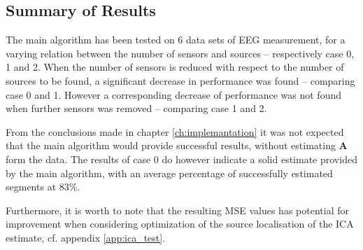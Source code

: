 \subsection{Summary of Results}
The main algorithm has been tested on 6 data sets of EEG measurement, for a varying relation between the number of sensors and sources -- respectively case 0, 1 and 2.
When the number of sensors is reduced with respect to the number of sources to be found, a significant decrease in performance was found -- comparing case 0 and 1. 
However a corresponding decrease of performance was not found when further sensors was removed -- comparing case 1 and 2. 

From the conclusions made in chapter \ref{ch:implemantation} it was not expected that the main algorithm would provide successful results, without estimating $\textbf{A}$ form the data. 
The results of case 0 do however indicate a solid estimate provided by the main algorithm, with an average percentage of successfully estimated segments at $83\%$. 

Furthermore, it is worth to note that the resulting MSE values has potential for improvement when considering optimization of the source localisation of the ICA estimate, cf. appendix \ref{app:ica_test}.




